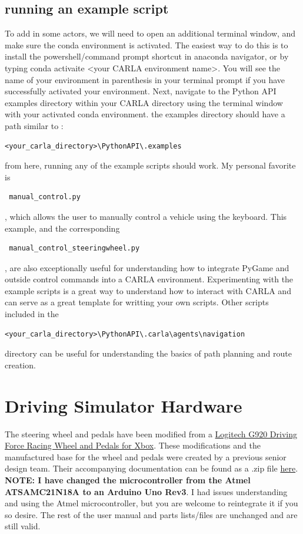 \documentclass{article}
\begin{document}
\subsection{running an example script}
To add in some actors, we will need to open an additional terminal window, and make sure the conda environment is activated. The easiest way to do this is to install the powershell/command prompt shortcut in anaconda navigator, or by typing conda activaite <your CARLA environment name>. You will see the name of your environment in parenthesis in your terminal prompt if you have successfully activated your environment. Next, navigate to the Python API examples directory within your CARLA directory using the terminal window with your activated conda environment. the examples directory should have a path similar to :
\begin{verbatim}<your_carla_directory>\PythonAPI\.examples  \end{verbatim}

from here, running any of the example scripts should work. My personal favorite is \begin{verbatim} manual_control.py \end{verbatim}, which allows the user to manually control a vehicle using the keyboard. This example, and the corresponding \begin{verbatim} manual_control_steeringwheel.py \end{verbatim} , are also exceptionally useful for understanding how to integrate PyGame and outside control commands into a CARLA environment.
Experimenting with the example scripts is a great way to understand how to interact with CARLA and can serve as a great template for writting your own scripts. Other scripts included in the  \begin{verbatim}<your_carla_directory>\PythonAPI\.carla\agents\navigation  \end{verbatim} directory can be useful for understanding the basics of path planning and route creation.

\section{Driving Simulator Hardware}
The steering wheel and pedals have been modified from a \href{https://www.logitechg.com/en-sa/products/driving/driving-force-racing-wheel.941-000123.html}{Logitech G920 Driving Force Racing Wheel and Pedals for Xbox}.  These modifications and the manufactured base for the wheel and pedals were created by a previous senior design team. Their accompanying documentation can be found as a .zip file \href{https://alabama.box.com/s/ppm0j7ax0zvq7z98z6g3qv7kapbet37a}{here}. \textbf{NOTE: I have changed the microcontroller from the Atmel ATSAMC21N18A to an Arduino Uno Rev3}. I had issues understanding and using the Atmel microcontroller, but you are welcome to reintegrate it if you so desire. The rest of the user manual and parts lists/files are unchanged and are still valid. 
\end{document}
